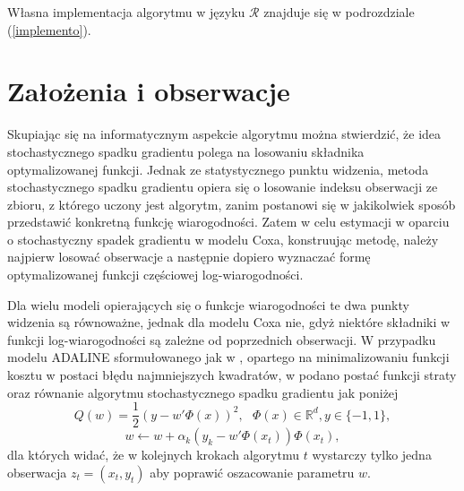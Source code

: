 Własna implementacja algorytmu w języku $\mathcal{R}$ znajduje się w podrozdziale (\ref{implemento}).

\section{Założenia i obserwacje}\label{zalozenia}

Skupiając się na informatycznym aspekcie algorytmu można stwierdzić, że idea stochastycznego spadku gradientu polega na losowaniu składnika optymalizowanej funkcji. Jednak ze statystycznego punktu widzenia, metoda stochastycznego spadku gradientu opiera się o losowanie indeksu obserwacji ze zbioru, z którego uczony jest algorytm, zanim postanowi się w jakikolwiek sposób przedstawić konkretną funkcję wiarogodności. Zatem w celu estymacji w oparciu o stochastyczny spadek gradientu w modelu Coxa, konstruując metodę, należy najpierw losować obserwacje a następnie dopiero wyznaczać formę optymalizowanej funkcji częściowej log-wiarogodności. 

Dla wielu modeli opierających się o funkcje wiarogodności te dwa punkty widzenia są równoważne, jednak dla modelu Coxa nie, gdyż niektóre składniki w funkcji log-wiarogodności są zależne od poprzednich obserwacji. W przypadku modelu ADALINE sformułowanego jak w \cite{ADALINE2}, opartego na minimalizowaniu funkcji kosztu w postaci błędu najmniejszych kwadratów, w \cite{bott2} podano postać funkcji straty oraz równanie algorytmu stochastycznego spadku gradientu jak poniżej
$$Q(w) = \frac{1}{2}(y-w'\varPhi(x))^2, \ \ \ \varPhi(x) \in \mathbb{R}^d, y \in \{-1,1\},$$ 
$$w \leftarrow w + \alpha_k(y_k-w'\varPhi(x_t))\varPhi(x_t),$$
dla których widać, że w kolejnych krokach algorytmu $t$ wystarczy tylko jedna obserwacja $z_t=(x_t,y_t)$ aby poprawić oszacowanie parametru $w$.

